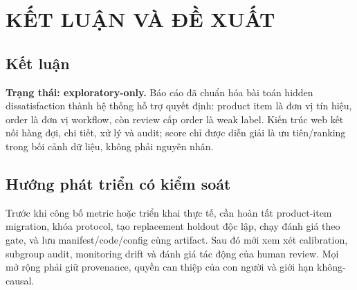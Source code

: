 
\section{KẾT LUẬN VÀ ĐỀ XUẤT}

\subsection{Kết luận}
\textbf{Trạng thái: exploratory-only.} Báo cáo đã chuẩn hóa bài toán hidden dissatisfaction thành hệ thống hỗ trợ quyết định: product item là đơn vị tín hiệu, order là đơn vị workflow, còn review cấp order là weak label. Kiến trúc web kết nối hàng đợi, chi tiết, xử lý và audit; score chỉ được diễn giải là ưu tiên/ranking trong bối cảnh dữ liệu, không phải nguyên nhân.

\subsection{Hướng phát triển có kiểm soát}
Trước khi công bố metric hoặc triển khai thực tế, cần hoàn tất product-item migration, khóa protocol, tạo replacement holdout độc lập, chạy đánh giá theo gate, và lưu manifest/code/config cùng artifact. Sau đó mới xem xét calibration, subgroup audit, monitoring drift và đánh giá tác động của human review. Mọi mở rộng phải giữ provenance, quyền can thiệp của con người và giới hạn không-causal.
